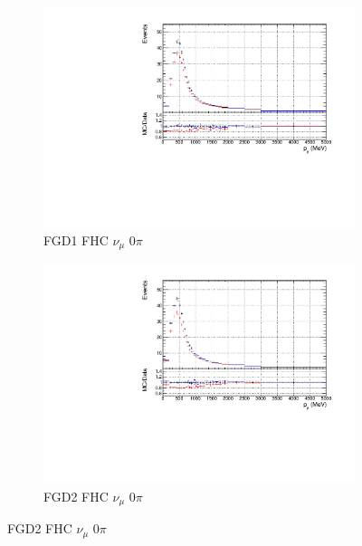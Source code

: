 \begin{figure}[!h]
\begin{subfigure}{0.49\textwidth}
  \centering
  \includegraphics[width=\textwidth]{figs/priorpred1D_p_FGD1_numuCC_0pi}
  \caption{FGD1 FHC $\nu_{\mu}$ 0$\pi$}
\end{subfigure}
\begin{subfigure}{0.49\textwidth}
  \centering
  \includegraphics[width=\textwidth]{figs/priorpred1D_p_FGD2_numuCC_0pi}
  \caption{FGD2 FHC $\nu_{\mu}$ 0$\pi$}
\end{subfigure}


\end{figure}

